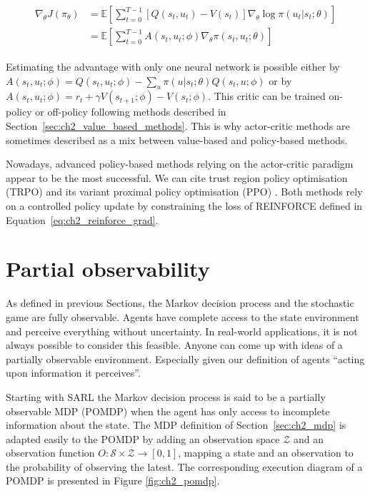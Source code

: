 \begin{align}
\begin{split}
\label{eq:ch2_baseline_actor_crit}
    \nabla_\theta J(\pi_\theta)
    & = \mathbb{E}\left[\sum_{t=0}^{T-1} [Q(s_t, u_t) - V(s_t)] \nabla_\theta \log \pi(u_t|s_t;\theta)\right]\\
    & = \mathbb{E} \left[\sum_{t=0}^{T-1} A(s_t, u_t; \phi) \nabla_\theta \pi(s_t, u_t; \theta)\right]
\end{split}
\end{align}

Estimating the advantage with only one neural network is possible either by $A(s_t,u_t; \phi)=Q(s_t, u_t;\phi)-\sum_u \pi(u|s_t;\theta) Q(s_t,u; \phi)$ or by $A(s_t,u_t; \phi)=r_t +\gamma V(s_{t+1};\phi) - V(s_t;\phi)$.
This critic can be trained on-policy or off-policy following methods described in Section~\ref{sec:ch2_value_based_methods}.
This is why actor-critic methods are sometimes described as a mix between value-based and policy-based methods.

Nowadays, advanced policy-based methods relying on the actor-critic paradigm appear to be the most successful.
We can cite trust region policy optimisation (TRPO) \citep{schulman2015trust} and its variant proximal policy optimisation (PPO) \citep{schulman2017ppo}.
Both methods rely on a controlled policy update by constraining the loss of REINFORCE defined in Equation~\ref{eq:ch2_reinforce_grad}.

\section{Partial observability} \label{sec:ch2_partial_observability}
As defined in previous Sections, the Markov decision process and the stochastic game are fully observable.
Agents have complete access to the state environment and perceive everything without uncertainty.
In real-world applications, it is not always possible to consider this feasible.
Anyone can come up with ideas of a partially observable environment.
Especially given our definition of agents ``acting upon information it perceives''.

Starting with SARL the Markov decision process is said to be a partially observable MDP (POMDP) \citep{KAELBLING199899} when the agent has only access to incomplete information about the state.
The MDP definition of Section~\ref{sec:ch2_mdp} is adapted easily to the POMDP by adding an observation space $\mathcal{Z}$ and an observation function $O:\mathcal{S} \times \mathcal{Z} \rightarrow [0, 1]$, mapping a state and an observation to the probability of observing the latest.
The corresponding execution diagram of a POMDP is presented in Figure \ref{fig:ch2_pomdp}.

